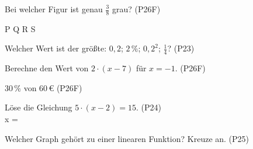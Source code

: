 \documentclass[11pt]{article}
\begin{document}
\small

\begin{aufgabe}{Bei welcher Figur ist genau $\frac{3}{8}$ grau? \hfill (P26F) \\    }

P  \quad Q  \quad R  \quad S 
\end{aufgabe}

\begin{aufgabe}{Welcher Wert ist der größte: $0{,}2$; $2\,\%$; $0{,}2^2$; $\frac{1}{4}$? \hfill (P23) \\ \leerfeld}
\end{aufgabe}

\begin{aufgabe}{Berechne den Wert von $2 \cdot (x - 7)$ für $x = -1$. \hfill (P26F) \\ \leerfeld}
\end{aufgabe}

\begin{aufgabe}{$30\,\%$ von $60\,€$ \hfill (P26F) \\ \leerfeld[€]}
\end{aufgabe}

\begin{aufgabe}{Löse die Gleichung $5 \cdot (x - 2) = 15$. \hfill (P24) \\ x = \leerfeld}
\end{aufgabe}

\begin{aufgabe}{\begin{minipage}[t]{0.6\linewidth}Welcher Graph gehört zu einer linearen Funktion? Kreuze an. \hfill (P25) \\    \end{minipage}\hfill\begin{minipage}[t]{0.37\linewidth}\vspace{0pt}
\begin{ksys}[xmin=-5,xmax=5,ymin=-5,ymax=5,klein]     \end{ksys}
\end{minipage}}
\end{aufgabe}
\end{document}
